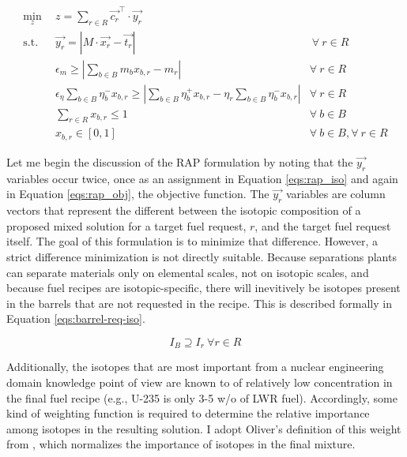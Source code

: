 
\begin{subequations}\label{eqs:rap}
  \begin{align}
    \min_{z} \:\: & 
    z = \sum_{r \in R} \vec{c_{r}}^{\top} \cdot \vec{y_{r}}
    & \label{eqs:rap_obj} \\
    \text{s.t.} \:\: &
    \vec{y_{r}} = \left| M \cdot \vec{x_{r}}  - \vec{t_{r}} \right|
    &
    \: \forall \: r \in R \label{eqs:rap_iso} \\
    &
    \epsilon_{m} \geq \left| \sum_{b \in B} m_{b} x_{b,r} - m_{r} \right|
    & 
    \forall \: r \in R \label{eqs:rap_mass} \\
    &
    \epsilon_{\eta} \sum_{b \in B} \eta_{b}^{-} x_{b,r} \geq 
    \left| \sum_{b \in B} \eta_{b}^{+} x_{b,r} - 
           \eta_{r} \sum_{b \in B} \eta_{b}^{-} x_{b,r} \right|
    & 
    \forall \: r \in R \label{eqs:rap_eta} \\
    &
    \sum_{r \in R} x_{b,r} \leq 1
    & 
    \forall \: b \in B \label{eqs:rap_conserv} \\
    &
    x_{b,r} \in \left[ 0, 1 \right]
    & 
    \forall \: b \in B, \forall \: r \in R  \label{eqs:rap_x}
  \end{align}
\end{subequations}

Let me begin the discussion of the RAP formulation by noting that the
$\vec{y_{r}}$ variables occur twice, once as an assignment in
Equation \ref{eqs:rap_iso} and again in Equation \ref{eqs:rap_obj}, the
objective function. The $\vec{y_{r}}$ variables are column vectors that
represent the different between the isotopic composition of a proposed mixed
solution for a target fuel request, $r$, and the target fuel request itself. The
goal of this formulation is to minimize that difference. However, a strict
difference minimization is not directly suitable. Because separations plants can
separate materials only on elemental scales, not on isotopic scales, and because
fuel recipes are isotopic-specific, there will inevitively be isotopes present
in the barrels that are not requested in the recipe. This is described formally
in Equation \ref{eqs:barrel-req-iso}.

\begin{equation}
\label{eqs:barrel-req-iso}
I_{B} \supseteq I_{r} \: \forall r \in R
\end{equation}

Additionally, the isotopes that are most important from a nuclear engineering
domain knowledge point of view are known to of relatively low concentration in
the final fuel recipe (e.g., U-235 is only 3-5 w/o of LWR fuel). Accordingly,
some kind of weighting function is required to determine the relative importance
among isotopes in the resulting solution. I adopt Oliver's definition of this
weight from \cite{oliver_geniusv2:_2009}, which normalizes the importance of
isotopes in the final mixture.

